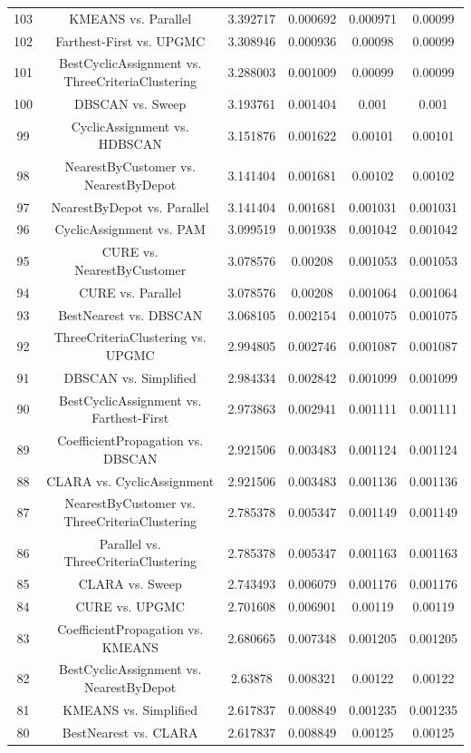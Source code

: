 \documentclass[a4paper,10pt]{article}
\begin{document}
\begin{landscape}
\begin{table}[!htp]
\begin{tabular}{cccccc}
103&KMEANS vs. Parallel&3.392717&0.000692&0.000971&0.00099\\
102&Farthest-First vs. UPGMC&3.308946&0.000936&0.00098&0.00099\\
101&BestCyclicAssignment vs. ThreeCriteriaClustering&3.288003&0.001009&0.00099&0.00099\\
100&DBSCAN vs. Sweep&3.193761&0.001404&0.001&0.001\\
99&CyclicAssignment vs. HDBSCAN&3.151876&0.001622&0.00101&0.00101\\
98&NearestByCustomer vs. NearestByDepot&3.141404&0.001681&0.00102&0.00102\\
97&NearestByDepot vs. Parallel&3.141404&0.001681&0.001031&0.001031\\
96&CyclicAssignment vs. PAM&3.099519&0.001938&0.001042&0.001042\\
95&CURE vs. NearestByCustomer&3.078576&0.00208&0.001053&0.001053\\
94&CURE vs. Parallel&3.078576&0.00208&0.001064&0.001064\\
93&BestNearest vs. DBSCAN&3.068105&0.002154&0.001075&0.001075\\
92&ThreeCriteriaClustering vs. UPGMC&2.994805&0.002746&0.001087&0.001087\\
91&DBSCAN vs. Simplified&2.984334&0.002842&0.001099&0.001099\\
90&BestCyclicAssignment vs. Farthest-First&2.973863&0.002941&0.001111&0.001111\\
89&CoefficientPropagation vs. DBSCAN&2.921506&0.003483&0.001124&0.001124\\
88&CLARA vs. CyclicAssignment&2.921506&0.003483&0.001136&0.001136\\
87&NearestByCustomer vs. ThreeCriteriaClustering&2.785378&0.005347&0.001149&0.001149\\
86&Parallel vs. ThreeCriteriaClustering&2.785378&0.005347&0.001163&0.001163\\
85&CLARA vs. Sweep&2.743493&0.006079&0.001176&0.001176\\
84&CURE vs. UPGMC&2.701608&0.006901&0.00119&0.00119\\
83&CoefficientPropagation vs. KMEANS&2.680665&0.007348&0.001205&0.001205\\
82&BestCyclicAssignment vs. NearestByDepot&2.63878&0.008321&0.00122&0.00122\\
81&KMEANS vs. Simplified&2.617837&0.008849&0.001235&0.001235\\
80&BestNearest vs. CLARA&2.617837&0.008849&0.00125&0.00125\\

\end{tabular}
\end{table}
\end{landscape}
\end{document}
